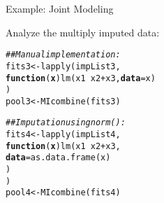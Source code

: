 \documentclass[10pt]{beamer}\usepackage[]{graphicx}\usepackage[]{color}
\makeatletter
\newcommand{\hlcom}[1]{\textcolor[rgb]{0.514,0.506,0.514}{\textit{#1}}}%
\newcommand{\hlopt}[1]{\textcolor[rgb]{0,0,0}{#1}}%
\newcommand{\hlstd}[1]{\textcolor[rgb]{0,0,0}{#1}}%
\newcommand{\hlkwa}[1]{\textcolor[rgb]{0,0,0}{\textbf{#1}}}%
\newcommand{\hlkwb}[1]{\textcolor[rgb]{0,0.341,0.682}{#1}}%
\newcommand{\hlkwc}[1]{\textcolor[rgb]{0,0,0}{\textbf{#1}}}%
\newcommand{\hlkwd}[1]{\textcolor[rgb]{0.004,0.004,0.506}{#1}}%
\newenvironment{kframe}{%
 \def\at@end@of@kframe{}%
 \ifinner\ifhmode%
  \def\at@end@of@kframe{\end{minipage}}%
  \begin{minipage}{\columnwidth}%
 \fi\fi%
 \def\FrameCommand##1{\hskip\@totalleftmargin \hskip-\fboxsep
 \colorbox{shadecolor}{##1}\hskip-\fboxsep
     \hskip-\linewidth \hskip-\@totalleftmargin \hskip\columnwidth}%
 \MakeFramed {\advance\hsize-\width
   \@totalleftmargin\z@ \linewidth\hsize
   \@setminipage}}%
 {\par\unskip\endMakeFramed%
 \at@end@of@kframe}
\newenvironment{knitrout}{}{} %
\makeatother
\begin{document}

\begin{frame}[fragile]{Example: Joint Modeling}

  Analyze the multiply imputed data:

\begin{knitrout}\footnotesize
{}\color{fgcolor}\begin{kframe}
\begin{alltt}
\hlcom{## Manual implementation:}
\hlstd{fits3} \hlkwb{<-} \hlkwd{lapply}\hlstd{(impList3,}
                \hlkwa{function}\hlstd{(}\hlkwc{x}\hlstd{)} \hlkwd{lm}\hlstd{(x1} \hlopt{~} \hlstd{x2} \hlopt{+} \hlstd{x3,} \hlkwc{data} \hlstd{= x)}
                \hlstd{)}
\hlstd{pool3} \hlkwb{<-} \hlkwd{MIcombine}\hlstd{(fits3)}
\end{alltt}


{\ttfamily\noindent\bfseries\color{errorcolor}{Error in variances[[1]]: subscript out of bounds}}\begin{alltt}
\hlcom{## Imputation using norm():}
\hlstd{fits4} \hlkwb{<-} \hlkwd{lapply}\hlstd{(impList4,}
                \hlkwa{function}\hlstd{(}\hlkwc{x}\hlstd{)} \hlkwd{lm}\hlstd{(x1} \hlopt{~} \hlstd{x2} \hlopt{+} \hlstd{x3,}
                               \hlkwc{data} \hlstd{=} \hlkwd{as.data.frame}\hlstd{(x)}
                               \hlstd{)}
                \hlstd{)}
\hlstd{pool4} \hlkwb{<-} \hlkwd{MIcombine}\hlstd{(fits4)}
\end{alltt}


{\ttfamily\noindent\bfseries\color{errorcolor}{Error in variances[[1]]: subscript out of bounds}}\end{kframe}
\end{knitrout}

\end{frame}

\watermarkon %
\end{document}
